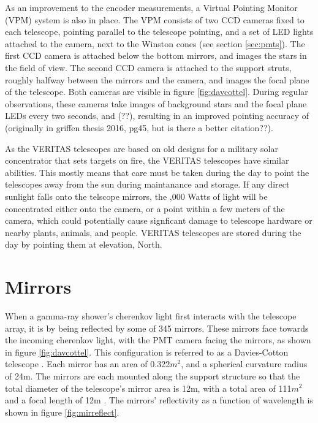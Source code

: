 As an improvement to the encoder measurements, a Virtual Pointing Monitor (VPM) system is also in place.
The VPM consists of two CCD cameras fixed to each telescope, pointing parallel to the telescope pointing, and a set of LED lights attached to the camera, next to the Winston cones (see section \ref{sec:pmts}).
The first CCD camera is attached below the bottom mirrors, and images the stars in the field of view.
The second CCD camera is attached to the support struts, roughly halfway between the mirrors and the camera, and images the focal plane of the telescope.
Both cameras are visible in figure \ref{fig:davcottel}.
During regular observations, these cameras take images of background stars and the focal plane LEDs every two seconds, and (??), resulting in an improved pointing accuracy of \degree (originally in griffen thesis 2016, pg45, but is there a better citation??).

As the VERITAS telescopes are based on old designs for a military solar concentrator that sets targets on fire\cite{daviescotton}, the VERITAS telescopes have similar abilities.
This mostly means that care must be taken during the day to point the telescopes away from the sun during maintanance and storage.
If any direct sunlight falls onto the telscope mirrors, the ,000 Watts of light will be concentrated either onto the camera, or a point within a few meters of the camera, which could potentially cause signficant damage to telescope hardware or nearby plants, animals, and people.
VERITAS telescopes are stored during the day by pointing them at \degree elevation, North.


\section{Mirrors}\label{sec:mirrors}

When a gamma-ray shower's cherenkov light first interacts with the telescope array, it is by being reflected by some of 345 mirrors.
These mirrors face towards the incoming cherenkov light, with the PMT camera facing the mirrors, as shown in figure \ref{fig:davcottel}.
This configuration is referred to as a Davies-Cotton telescope \cite{daviescotton}.
Each mirror has an area of 0.322$m^2$, and a spherical curvature radius of 24m.
The mirrors are each mounted along the support structure so that the total diameter of the telescope's mirror area is 12m, with a total area of 111$m^2$ and a focal length of 12m \cite{Veritas_Detector}.
The mirrors' reflectivity as a function of wavelength is shown in figure \ref{fig:mirreflect}.

